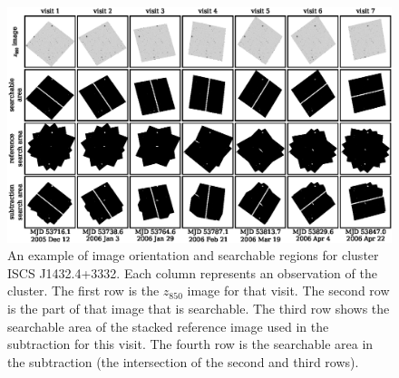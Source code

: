\begin{figure}[p]
\begin{center}
\includegraphics[width=6.75in,angle=270]{figures/cands/epochs.eps}
\end{center}
\caption[An example of image orientation and searchable regions]
{An example of image orientation and searchable regions for cluster
ISCS J1432.4+3332. Each column represents an observation of the
cluster. The first row is the $z_{850}$ image for that visit. The
second row is the part of that image that is searchable. The third row
shows the searchable area of the stacked reference image used in the
subtraction for this visit. The fourth row is the searchable area in
the subtraction (the intersection of the second and third
rows).  \label{fig:epochs}}
\end{figure}


